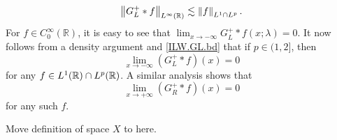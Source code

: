 \documentclass[../dissertation.tex]{subfiles}
\begin{document}
\begin{equation}
	\label{ILW.GL.bd}
	\norm[L^\infty(\mathbb R)]{G_L^+*f} \lesssim \norm[L^1 \cap L^p]{f}.
\end{equation}
For $f \in C_0^\infty(\mathbb R)$, it is easy to see that
$\lim_{x \to -\infty} G_L^+ * f(x;\lambda) = 0$. It now follows from a density 
argument and \eqref{ILW.GL.bd} that if $p \in (1,2]$, then
\begin{equation}
	\label{ILW.GL.vanish}
	\lim_{x \to -\infty} \left(G_L^+*f\right)(x) = 0
\end{equation}
for any $f \in L^1(\mathbb{R}) \cap L^p(\mathbb{R})$. A similar analysis shows that 
\begin{equation}
	\label{ILW.GR.vanish}
	\lim_{x \to +\infty} \left(G_R^+*f\right)(x) =0
\end{equation}
for any such $f$.


{\color{red}Move definition of space $X$ to here.}

\begin{prop}
	
\end{prop}
\end{document}
